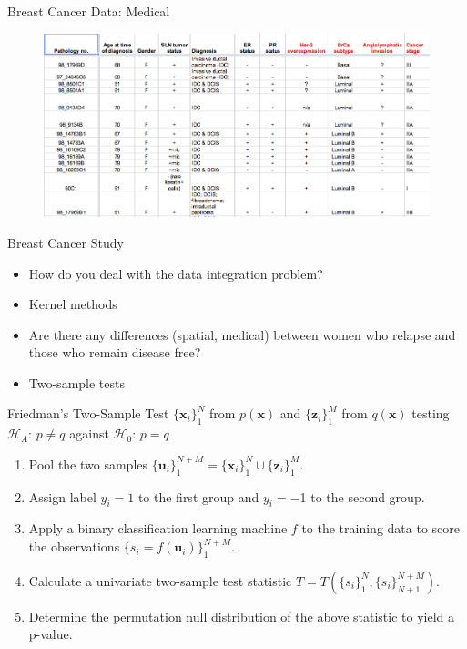 \documentclass{beamer}
\begin{document}
\begin{frame}{Breast Cancer Data: Medical}
  \begin{figure}
    \centering
    \includegraphics[scale=.5]{medical.png}
  \end{figure}
\end{frame}

\begin{frame}{Breast Cancer Study}
  \begin{itemize}
  \item How do you deal with the data integration problem? \pause
  \item Kernel methods \pause
  \item Are there any differences (spatial, medical) between women who
    relapse and those who remain disease free? \pause 
  \item Two-sample tests
  \end{itemize}
\end{frame}

\begin{frame}{Friedman's Two-Sample Test}
  $\{\mathbf{x}_i\}_1^N$ from $p(\mathbf{x})$ and
  $\{\mathbf{z}_i\}_1^M$ from $q(\mathbf{x})$ testing \\ 
  $\mathcal{H}_A$: $p \neq q$ against $\mathcal{H}_0$: $p = q$ \pause
  \begin{enumerate}
  \item Pool the two samples $\{\mathbf{u}_i\}_1^{N+M} =
    \{\mathbf{x}_i\}_1^{N} \cup \{\mathbf{z}_i\}_1^{M}$. \pause
  \item Assign label $y_i = 1$ to the first group and $y_i = -$1 to
    the second group. \pause
  \item Apply a binary classification learning machine $f$ to the training
    data to score the observations $\{s_i =
    f(\mathbf{u}_i)\}_1^{N+M}$. \pause
  \item Calculate a univariate two-sample test statistic $T =
    T(\{s_i\}_1^N,\{s_i\}_{N+1}^{N+M})$. \pause
  \item Determine the permutation null distribution of the above
    statistic to yield a p-value.
  \end{enumerate}  
\end{frame}
\end{document}
